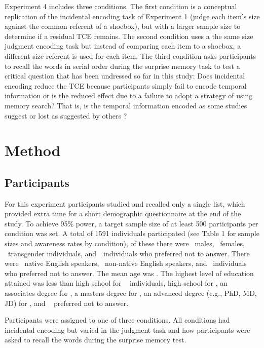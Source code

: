 \documentclass[man,natbib,floatsintext]{apa6} %
\begin{document}
Experiment 4 includes three conditions. The first condition is a conceptual replication of the incidental encoding task of Experiment 1 (judge each item's size against the common referent of a shoebox), but with a larger sample size to determine if a residual TCE remains. The second condition uses a the same size judgment encoding task but instead of comparing each item to a shoebox, a different size referent is used for each item. The third condition asks participants to recall the words in serial order during the surprise memory task to test a critical question that has been undressed so far in this study: Does incidental encoding reduce the TCE because participants simply fail to encode temporal information or is the reduced effect due to a failure to adopt a strategy of using memory search? That is, is the temporal information encoded as some studies suggest \citep{Nair91,Nair90b} or lost as suggested by others \cite{GlenBrad79,BradGlen83}?   


\section{Method}
\label{TODO-8}
\subsection{Participants}
For this experiment participants studied and recalled only a single list, which provided extra time for a short demographic questionnaire at the end of the study. To achieve 95\% power, a target sample size of at least 500 participants per condition was set. A total of 1591 individuals participated (see Table 1 for sample sizes and awareness rates by condition), of these there were \males~males, \females~females, \others~transgender individuals, and~\notans~individuals who preferred not to answer. There were \engY~native English speakers, \engN~non-native English speakers, and \engS~individuals who preferred not to answer.  The mean age was \age. The highest level of education attained was less than high school for \noed~ individuals, high school for \hschool, an associates degree for \ass, a masters degree for \mas, an advanced degree (e.g., PhD, MD, JD) for \phd, and \notansed~ preferred not to answer.

Participants were assigned to one of three conditions. All conditions had incidental encoding but varied in the judgment task and how participants were asked to recall the words during the surprise memory test.
\end{document}

